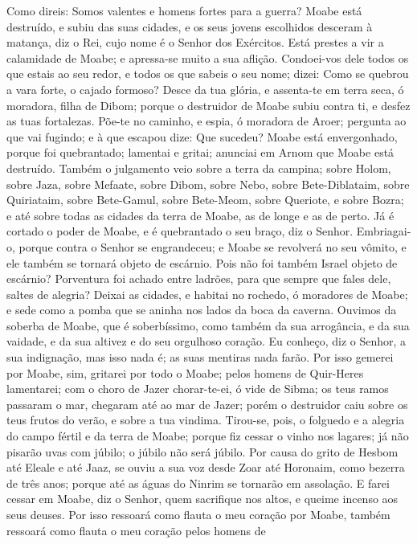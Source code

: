Como direis: Somos valentes e homens fortes para a guerra?
Moabe está destruído, e subiu das suas cidades, e os seus
jovens escolhidos desceram à matança, diz o Rei, cujo nome é o
Senhor dos Exércitos. Está prestes a vir a calamidade de
Moabe; e apressa-se muito a sua aflição. Condoei-vos dele
todos os que estais ao seu redor, e todos os que sabeis o seu nome;
dizei: Como se quebrou a vara forte, o cajado formoso? Desce
da tua glória, e assenta-te em terra seca, ó moradora, filha de
Dibom; porque o destruidor de Moabe subiu contra ti, e desfez as
tuas fortalezas. Põe-te no caminho, e espia, ó moradora de
Aroer; pergunta ao que vai fugindo; e à que escapou dize: Que
sucedeu? Moabe está envergonhado, porque foi quebrantado;
lamentai e gritai; anunciai em Arnom que Moabe está destruído.
Também o julgamento veio sobre a terra da campina; sobre
Holom, sobre Jaza, sobre Mefaate, sobre Dibom, sobre Nebo,
sobre Bete-Diblataim, sobre Quiriataim, sobre Bete-Gamul,
sobre Bete-Meom, sobre Queriote, e sobre Bozra; e até sobre
todas as cidades da terra de Moabe, as de longe e as de perto.
Já é cortado o poder de Moabe, e é quebrantado o seu braço,
diz o Senhor. Embriagai-o, porque contra o Senhor se
engrandeceu; e Moabe se revolverá no seu vômito, e ele também se
tornará objeto de escárnio. Pois não foi também Israel objeto
de escárnio? Porventura foi achado entre ladrões, para que sempre
que fales dele, saltes de alegria? Deixai as cidades, e
habitai no rochedo, ó moradores de Moabe; e sede como a pomba que se
aninha nos lados da boca da caverna. Ouvimos da soberba de
Moabe, que é soberbíssimo, como também da sua arrogância, e da sua
vaidade, e da sua altivez e do seu orgulhoso coração. Eu
conheço, diz o Senhor, a sua indignação, mas isso nada é; as suas
mentiras nada farão. Por isso gemerei por Moabe, sim,
gritarei por todo o Moabe; pelos homens de Quir-Heres lamentarei;
com o choro de Jazer chorar-te-ei, ó vide de Sibma; os teus
ramos passaram o mar, chegaram até ao mar de Jazer; porém o
destruidor caiu sobre os teus frutos do verão, e sobre a tua
vindima. Tirou-se, pois, o folguedo e a alegria do campo
fértil e da terra de Moabe; porque fiz cessar o vinho nos lagares;
já não pisarão uvas com júbilo; o júbilo não será júbilo. Por
causa do grito de Hesbom até Eleale e até Jaaz, se ouviu a sua voz
desde Zoar até Horonaim, como bezerra de três anos; porque até as
águas do Ninrim se tornarão em assolação. E farei cessar em
Moabe, diz o Senhor, quem sacrifique nos altos, e queime incenso aos
seus deuses. Por isso ressoará como flauta o meu coração por
Moabe, também ressoará como flauta o meu coração pelos homens de
